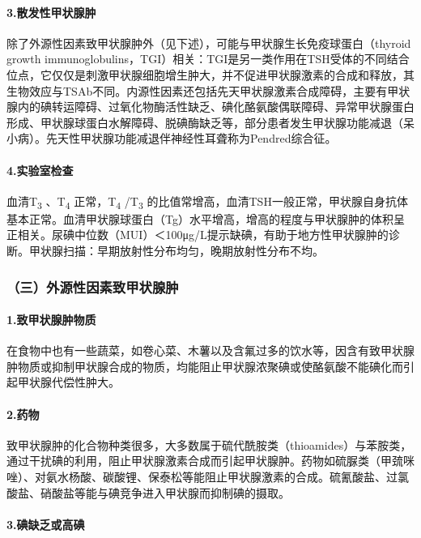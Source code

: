 \paragraph{3.散发性甲状腺肿}

除了外源性因素致甲状腺肿外（见下述），可能与甲状腺生长免疫球蛋白（thyroid
growth
immunoglobulins，TGI）相关：TGI是另一类作用在TSH受体的不同结合位点，它仅仅是刺激甲状腺细胞增生肿大，并不促进甲状腺激素的合成和释放，其生物效应与TSAb不同。内源性因素还包括先天甲状腺激素合成障碍，主要有甲状腺内的碘转运障碍、过氧化物酶活性缺乏、碘化酪氨酸偶联障碍、异常甲状腺蛋白形成、甲状腺球蛋白水解障碍、脱碘酶缺乏等，部分患者发生甲状腺功能减退（呆小病）。先天性甲状腺功能减退伴神经性耳聋称为Pendred综合征。

\paragraph{4.实验室检查}

血清T\textsubscript{3} 、T\textsubscript{4} 正常，T\textsubscript{4}
/T\textsubscript{3}
的比值常增高，血清TSH一般正常，甲状腺自身抗体基本正常。血清甲状腺球蛋白（Tg）水平增高，增高的程度与甲状腺肿的体积呈正相关。尿碘中位数（MUI）＜100μg/L提示缺碘，有助于地方性甲状腺肿的诊断。甲状腺扫描：早期放射性分布均匀，晚期放射性分布不均。

\subsubsection{（三）外源性因素致甲状腺肿}

\paragraph{1.致甲状腺肿物质}

在食物中也有一些蔬菜，如卷心菜、木薯以及含氟过多的饮水等，因含有致甲状腺肿物质或抑制甲状腺合成的物质，均能阻止甲状腺浓聚碘或使酪氨酸不能碘化而引起甲状腺代偿性肿大。

\paragraph{2.药物}

致甲状腺肿的化合物种类很多，大多数属于硫代酰胺类（thioamides）与苯胺类，通过干扰碘的利用，阻止甲状腺激素合成而引起甲状腺肿。药物如硫脲类（甲巯咪唑）、对氨水杨酸、碳酸锂、保泰松等能阻止甲状腺激素的合成。硫氰酸盐、过氯酸盐、硝酸盐等能与碘竞争进入甲状腺而抑制碘的摄取。

\paragraph{3.碘缺乏或高碘}

